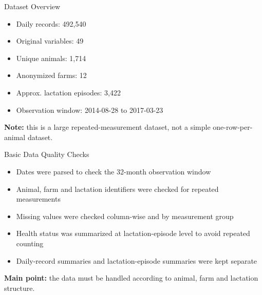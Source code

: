 \begin{frame}{Dataset Overview}

\begin{itemize}
    \item Daily records: 492,540
    \item Original variables: 49
    \item Unique animals: 1,714
    \item Anonymized farms: 12
    \item Approx. lactation episodes: 3,422
    \item Observation window: 2014-08-28 to 2017-03-23
\end{itemize}

\vspace{0.3cm}

\textbf{Note:} this is a large repeated-measurement dataset, not a simple one-row-per-animal dataset.

\end{frame}

\begin{frame}{Basic Data Quality Checks}

\begin{itemize}
    \item Dates were parsed to check the 32-month observation window
    \item Animal, farm and lactation identifiers were checked for repeated measurements
    \item Missing values were checked column-wise and by measurement group
    \item Health status was summarized at lactation-episode level to avoid repeated counting
    \item Daily-record summaries and lactation-episode summaries were kept separate
\end{itemize}

\vspace{0.25cm}

\textbf{Main point:} the data must be handled according to animal, farm and lactation structure.

\end{frame}

